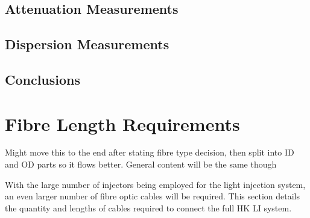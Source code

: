 \documentclass[a4paper,11pt]{article}
\begin{document}
\subsection{Attenuation Measurements}

\subsection{Dispersion Measurements}

\subsection{Conclusions}


\section{Fibre Length Requirements}\label{sec:lengths}

{\color{red} Might move this to the end after stating fibre type decision, then split into ID and OD parts so it flows better. General content will be the same though}

With the large number of injectors being employed for the light injection system, an even larger number of fibre optic cables will be required. This section details the quantity and lengths of cables required to connect the full HK LI system.
\end{document}
